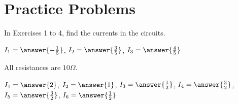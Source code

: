 \documentclass{ximera}
\begin{document}
\section*{Practice Problems}



In Exercises 1 to 4, find the currents in the circuits.

\begin{problem}
%
\end{problem}

\begin{problem}
%

$ I_1 = \answer{-\frac{1}{5}}$, $I_2 = \answer{\frac{3}{5}}$, $I_3 = \answer{\frac{4}{5}}$


\end{problem}

\begin{problem}
%
\end{problem}

\begin{problem}
All resistances are $10 \Omega$.

%

$ I_1 = \answer{2}$, $I_2 = \answer{1}$, $I_3 = \answer{\frac{1}{2}}$, $I_4 = \answer{\frac{3}{2}}$, $I_5 = \answer{\frac{3}{2}}$, $I_6 = \answer{\frac{1}{2}}$

\end{problem}
\end{document}
